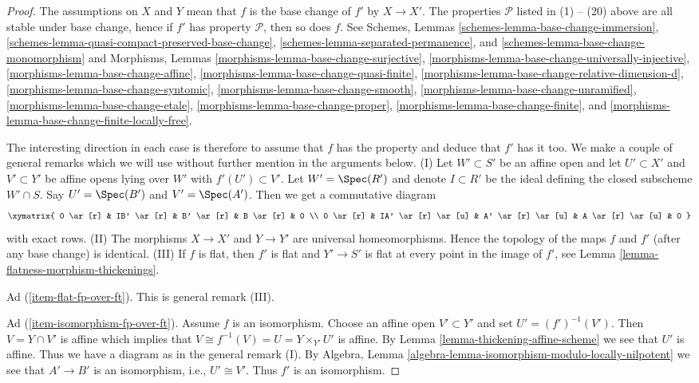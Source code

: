 \begin{proof}
The assumptions on $X$ and $Y$ mean that $f$ is the base change of
$f'$ by $X \to X'$.
The properties $\mathcal{P}$ listed in (1) -- (20) above are all stable
under base change, hence if $f'$ has property $\mathcal{P}$, then so
does $f$. See
Schemes, Lemmas \ref{schemes-lemma-base-change-immersion},
\ref{schemes-lemma-quasi-compact-preserved-base-change},
\ref{schemes-lemma-separated-permanence}, and
\ref{schemes-lemma-base-change-monomorphism}
and
Morphisms, Lemmas
\ref{morphisms-lemma-base-change-surjective},
\ref{morphisms-lemma-base-change-universally-injective},
\ref{morphisms-lemma-base-change-affine},
\ref{morphisms-lemma-base-change-quasi-finite},
\ref{morphisms-lemma-base-change-relative-dimension-d},
\ref{morphisms-lemma-base-change-syntomic},
\ref{morphisms-lemma-base-change-smooth},
\ref{morphisms-lemma-base-change-unramified},
\ref{morphisms-lemma-base-change-etale},
\ref{morphisms-lemma-base-change-proper},
\ref{morphisms-lemma-base-change-finite}, and
\ref{morphisms-lemma-base-change-finite-locally-free}.

\medskip\noindent
The interesting direction in each case is therefore to assume
that $f$ has the property and deduce that $f'$ has it too.
We make a couple of general remarks which we will use without further
mention in the arguments below.
(I) Let $W' \subset S'$ be an affine open and let $U' \subset X'$
and $V' \subset Y'$ be affine opens lying over $W'$ with $f'(U') \subset V'$.
Let $W' = \Spec(R')$ and denote $I \subset R'$ be the ideal
defining the closed subscheme $W' \cap S$. Say $U' = \Spec(B')$
and $V' = \Spec(A')$. Then we get a commutative diagram
$$
\xymatrix{
0 \ar[r] &
IB' \ar[r] &
B' \ar[r] &
B \ar[r] & 0 \\
0 \ar[r] &
IA' \ar[r] \ar[u] &
A' \ar[r] \ar[u] &
A \ar[r] \ar[u] & 0
}
$$
with exact rows.
(II) The morphisms $X \to X'$ and $Y \to Y'$ are universal homeomorphisms.
Hence the topology of the maps $f$ and $f'$ (after any base change) is
identical.
(III) If $f$ is flat, then $f'$ is flat and $Y' \to S'$ is flat at every
point in the image of $f'$, see
Lemma \ref{lemma-flatness-morphism-thickenings}.

\medskip\noindent
Ad (\ref{item-flat-fp-over-ft}). This is general remark (III).

\medskip\noindent
Ad (\ref{item-isomorphism-fp-over-ft}). Assume $f$ is an isomorphism.
Choose an affine open $V' \subset Y'$ and set $U' = (f')^{-1}(V')$.
Then $V = Y \cap V'$ is affine which implies that
$V \cong f^{-1}(V) = U = Y \times_{Y'} U'$ is affine. By
Lemma \ref{lemma-thickening-affine-scheme}
we see that $U'$ is affine. Thus we have a diagram as in the
general remark (I). By Algebra, Lemma
\ref{algebra-lemma-isomorphism-modulo-locally-nilpotent}
we see that $A' \to B'$ is an isomorphism, i.e., $U' \cong V'$.
Thus $f'$ is an isomorphism.


\end{proof}
